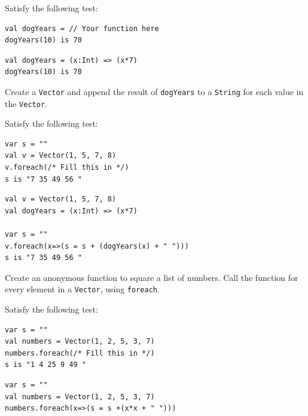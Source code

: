\documentclass[a4paper,12pt]{exam}
\begin{document}
\begin{questions}
Satisfy the following test:
\begin{Verbatim}
val dogYears = // Your function here
dogYears(10) is 70
\end{Verbatim}

\begin{solution}
\begin{Verbatim}
val dogYears = (x:Int) => (x*7)
dogYears(10) is 70	
\end{Verbatim}	
\end{solution}

\question
Create a \texttt{Vector} and append the result of \texttt{dogYears} to a \texttt{String} 
for each value in the \texttt{Vector}. 

Satisfy the following test:
\begin{Verbatim}
var s = ""
val v = Vector(1, 5, 7, 8)
v.foreach(/* Fill this in */)
s is "7 35 49 56 "
\end{Verbatim}

\begin{solution}
\begin{Verbatim}
val v = Vector(1, 5, 7, 8)
val dogYears = (x:Int) => (x*7)

var s = ""
v.foreach(x=>(s = s + (dogYears(x) + " ")))
s is "7 35 49 56 "	
\end{Verbatim}	
\end{solution}

\question
Create an anonymous function to square a list of numbers. 
Call the function for every element in a \texttt{Vector}, using \texttt{foreach}. 

Satisfy the following test:
\begin{Verbatim}
var s = ""
val numbers = Vector(1, 2, 5, 3, 7) 
numbers.foreach(/* Fill this in */) 
s is "1 4 25 9 49 "
\end{Verbatim}

\begin{solution}
\begin{Verbatim}
var s = ""
val numbers = Vector(1, 2, 5, 3, 7)
numbers.foreach(x=>(s = s +(x*x + " ")))	
\end{Verbatim}	
\end{solution}

\end{questions}
\end{document}
